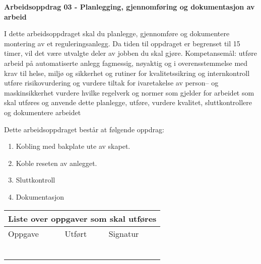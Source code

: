 
\noindent
{\bf Arbeidsoppdrag 03 - Planlegging, gjennomføring  og dokumentasjon  av arbeid}

I dette arbeidsoppdraget skal du planlegge, gjennomføre og dokumentere montering av et reguleringsanlegg. Da tiden til oppdraget er begrenset til 15  timer, vil det være utvalgte deler av jobben du skal gjøre. 
\vskip 5pt
Kompetansemål:
utføre arbeid på automatiserte anlegg fagmessig, nøyaktig og i overensstemmelse med krav til helse, miljø og sikkerhet og rutiner for kvalitetssikring og internkontroll
utføre risikovurdering og vurdere tiltak for ivaretakelse av person– og maskinsikkerhet
vurdere hvilke regelverk og normer som gjelder for arbeidet som skal utføres og anvende dette
planlegge, utføre, vurdere kvalitet, sluttkontrollere og dokumentere arbeidet


Dette arbeidsoppdraget består at følgende oppdrag:
\begin{enumerate}
	\item Kobling med bakplate ute av skapet. 
	\item Koble reseten av anlegget. 
	\item Sluttkontroll
	\item Dokumentasjon
\end{enumerate}
\vskip 5pt

\begin{center}
\begin{tabular}{ | m{8cm} | m{1cm}| m{2cm} | } 
\hline
\multicolumn{3}{|c|}{Liste over oppgaver som skal utføres} \\
	\hline
	Oppgave	& Utført & Signatur \\ 
	\hline
	\hline
	& & \\ 
	\hline
	& & \\ 
	\hline
	& & \\ 
	\hline
	& & \\ 
	\hline
	& & \\ 
	\hline
	& & \\ 
	\hline
\end{tabular}
\end{center}


